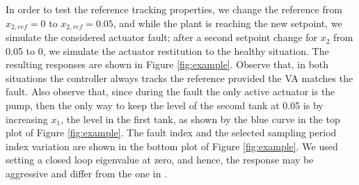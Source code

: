 \documentclass[letterpaper, 10 pt, conference]{ieeeconf}
\begin{document}
  In order to test the reference tracking properties, we change the
  reference from $x_{2,ref} = 0$ to $x_{2,ref} = 0.05$, and while the
  plant is reaching the new setpoint, we simulate the considered
  actuator fault; after a second setpoint change for $x_2$ from 0.05
  to 0, we simulate the actuator restitution to the healthy
  situation. The resulting responses are shown in Figure
  \ref{fig:example}. Observe that, in both situations the controller
  always tracks the reference provided the VA matches the fault. Also
  observe that, since during the fault the only active actuator is the
  pump, then the only way to keep the level of the second tank at 0.05
  is by increasing $x_1$, the level in the first tank, as shown by the
  blue curve in the top plot of Figure \ref{fig:example}. The fault
  index and the selected sampling period index variation are shown in
  the bottom plot of Figure \ref{fig:example}. We used \cite[Algorithm
    1]{haimobras_2010} setting a closed loop eigenvalue at zero, and
  hence, the response may be aggressive and differ from the one in
  \cite{steffen_controlReconfigurations}.
\end{document}
